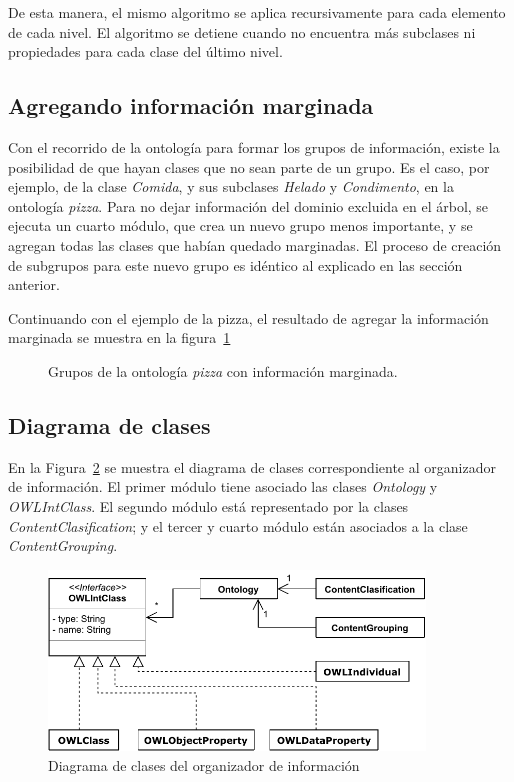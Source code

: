 De esta manera, el mismo algoritmo se aplica recursivamente para cada elemento de cada nivel. El algoritmo se detiene cuando no encuentra más subclases ni propiedades para cada clase del último nivel.

\subsection{Agregando información marginada}
Con el recorrido de la ontología para formar los grupos de información, existe la posibilidad de que hayan clases que no sean parte de un grupo. Es el caso, por ejemplo, de la clase \emph{Comida}, y sus subclases \emph{Helado} y \emph{Condimento}, en la ontología \emph{pizza}. Para no dejar información del dominio excluida en el árbol, se ejecuta un cuarto módulo, que crea un nuevo grupo menos importante, y se agregan todas las clases que habían quedado marginadas. El proceso de creación de subgrupos para este nuevo grupo es idéntico al explicado en las sección anterior.

Continuando con el ejemplo de la pizza, el resultado de agregar la  información marginada se muestra en la figura~\ref{fig:macro_planning_pizza_marg}

\begin{figure}[H]
\caption{Grupos de la ontología \emph{pizza} con información marginada.}
\label{fig:macro_planning_pizza_marg}
\end{figure}

\subsection{Diagrama de clases}
En la Figura~\ref{fig:diagrama_clases_organizador} se muestra el diagrama de clases correspondiente al organizador de información. El primer módulo tiene asociado las clases \emph{Ontology} y \emph{OWLIntClass}. El segundo módulo está representado por la clases \emph{ContentClasification}; y el tercer y cuarto módulo están asociados a la clase \emph{ContentGrouping}.

\begin{figure}[H]
    \centering
    \includegraphics[width=10cm]{img/organizacion_informacion/clases_organizador_informacion.pdf}
    \caption{Diagrama de clases del organizador de información}
    \label{fig:diagrama_clases_organizador}
\end{figure}

